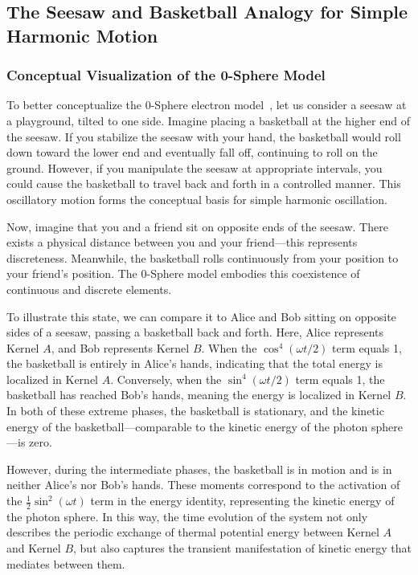 \documentclass[%
 reprint,
 amsmath,amssymb,
 aps,
]{revtex4-1}
\numberwithin{equation}{section}%
\begin{document}
\subsection{The Seesaw and Basketball Analogy for Simple Harmonic Motion}

\subsubsection{Conceptual Visualization of the 0-Sphere Model}
To better conceptualize the 0-Sphere electron model~\cite{hanamura2020}, let us consider a seesaw at a playground, tilted to one side. Imagine placing a basketball at the higher end of the seesaw. If you stabilize the seesaw with your hand, the basketball would roll down toward the lower end and eventually fall off, continuing to roll on the ground. However, if you manipulate the seesaw at appropriate intervals, you could cause the basketball to travel back and forth in a controlled manner. This oscillatory motion forms the conceptual basis for simple harmonic oscillation.

Now, imagine that you and a friend sit on opposite ends of the seesaw. There exists a physical distance between you and your friend—this represents discreteness. Meanwhile, the basketball rolls continuously from your position to your friend's position. The 0-Sphere model embodies this coexistence of continuous and discrete elements.

To illustrate this state, we can compare it to Alice and Bob sitting on opposite sides of a seesaw, passing a basketball back and forth. Here, Alice represents Kernel $A$, and Bob represents Kernel $B$. When the $\cos^4(\omega t/2)$ term equals 1, the basketball is entirely in Alice's hands, indicating that the total energy is localized in Kernel $A$. Conversely, when the $\sin^4(\omega t/2)$ term equals 1, the basketball has reached Bob's hands, meaning the energy is localized in Kernel $B$. In both of these extreme phases, the basketball is stationary, and the kinetic energy of the basketball---comparable to the kinetic energy of the photon sphere---is zero.

However, during the intermediate phases, the basketball is in motion and is in neither Alice's nor Bob's hands. These moments correspond to the activation of the $\frac{1}{2} \sin^2(\omega t)$ term in the energy identity, representing the kinetic energy of the photon sphere. In this way, the time evolution of the system not only describes the periodic exchange of thermal potential energy between Kernel $A$ and Kernel $B$, but also captures the transient manifestation of kinetic energy that mediates between them.
\end{document}
